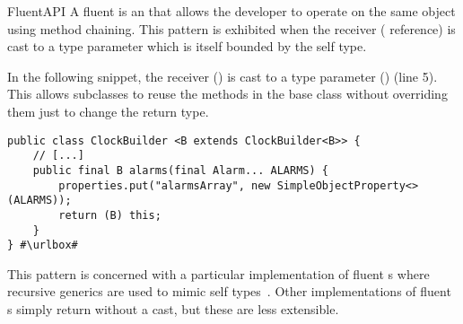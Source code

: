 \begin{pattern}{FluentAPI}
A fluent \api{} is an \api{} that allows the developer to operate on the same
object using method chaining.
This pattern is exhibited when the receiver ( reference) is cast to a type parameter
  which is itself bounded by the self type.


\instances{}
In the following snippet,%
\def\urlvar{http://bit.ly/HanSolo_Medusa_2TyBObH}
the receiver () is cast to a type parameter () (line 5).
This allows subclasses to reuse the methods in the base class without overriding them just to change the return type.

\begin{verbatim}
public class ClockBuilder <B extends ClockBuilder<B>> {
    // [...]
    public final B alarms(final Alarm... ALARMS) {
        properties.put("alarmsArray", new SimpleObjectProperty<>(ALARMS));
        return (B) this;
    }
} #\urlbox#
\end{verbatim}

\discussion{}
  This pattern is concerned with a particular implementation of fluent \api{}s
  where recursive generics are used to mimic self
  types~\cite{bruceChallengingTypingIssues2003}.
  Other implementations of fluent \api{}s simply return  without a
  cast, but these are less extensible.

\end{pattern}
